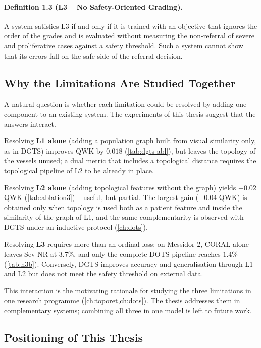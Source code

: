 \paragraph{Definition 1.3 (L3 -- No Safety-Oriented Grading).}
A system satisfies L3 if and only if it is trained with an objective that ignores the
order of the grades and is evaluated without measuring the non-referral of severe and
proliferative cases against a safety threshold. Such a system cannot show that its errors
fall on the safe side of the referral decision.

\subsection{Why the Limitations Are Studied Together}
\label{sec:coupled}

A natural question is whether each limitation could be resolved by adding one component
to an existing system. The experiments of this thesis suggest that the answers interact.

Resolving \textbf{L1 alone} (adding a population graph built from visual similarity only,
as in DGTS) improves QWK by $0.018$ (\cref{tab:dgts-abl}), but leaves the topology of the
vessels unused; a dual metric that includes a topological distance requires the
topological pipeline of L2 to be already in place.

Resolving \textbf{L2 alone} (adding topological features without the graph) yields $+0.02$
QWK (\cref{tab:ablation3}) -- useful, but partial. The largest gain ($+0.04$ QWK) is
obtained only when topology is used both as a patient feature and inside the similarity of
the graph of L1, and the same complementarity is observed with DGTS under an inductive protocol
(\cref{ch:dots}).

Resolving \textbf{L3} requires more than an ordinal loss: on Messidor-2, CORAL alone leaves
Sev-NR at $3.7\%$, and only the complete DOTS pipeline reaches $1.4\%$ (\cref{tab:h3b}).
Conversely, DGTS improves accuracy and generalisation through L1 and L2 but does not meet
the safety threshold on external data.

This interaction is the motivating rationale for studying the three limitations in one
research programme (\cref{ch:toporet,ch:dots}). The thesis addresses them in complementary
systems; combining all three in one model is left to future work.

\subsection{Positioning of This Thesis}
\label{sec:position}

